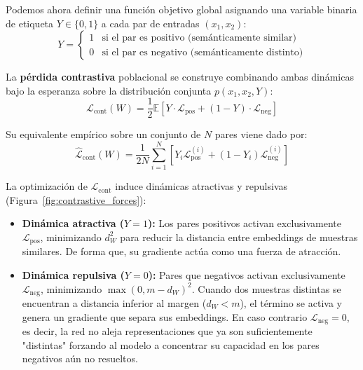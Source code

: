 Podemos ahora definir una función objetivo global asignando una variable binaria de etiqueta $Y \in \{0, 1\}$ a cada par de entradas $(x_1, x_2)$:
\begin{equation}
Y = \begin{cases}
1 & \text{si el par es positivo (semánticamente similar)} \\
0 & \text{si el par es negativo (semánticamente distinto)}
\end{cases}
\end{equation}
\vspace{2pt}

\begin{definition}
    
La \textbf{pérdida contrastiva} poblacional se construye combinando ambas dinámicas bajo la esperanza sobre la distribución conjunta $p(x_1, x_2, Y)$:
\begin{equation}
\mathcal{L}_{\text{cont}}(W) = \frac{1}{2} \mathbb{E} \left[ Y \cdot \mathcal{L}_{\text{pos}} + (1 - Y) \cdot \mathcal{L}_{\text{neg}} \right]
\label{eq:L_cont}
\end{equation}

Su equivalente empírico sobre un conjunto de $N$ pares viene dado por:
\begin{equation}
\hat{\mathcal{L}}_{\text{cont}}(W) = \frac{1}{2N} \sum_{i=1}^{N} \left[ Y_i \mathcal{L}_{\text{pos}}^{(i)} + (1 - Y_i) \mathcal{L}_{\text{neg}}^{(i)} \right]
\label{eq:L_cont_empirica}
\end{equation}
\end{definition}

La optimización de ${\mathcal{L}}_{\text{cont}}$ induce dinámicas atractivas y repulsivas (Figura~\ref{fig:contrastive_forces}):

\begin{itemize}
    \item \textbf{Dinámica atractiva ($Y=1$): } Los pares positivos activan exclusivamente $\mathcal{L}_{\text{pos}}$, minimizando $d_W^2$ para reducir la distancia entre embeddings de muestras similares. De forma que, su gradiente actúa como una fuerza de atracción.
    
    \item \textbf{Dinámica repulsiva ($Y=0$): } Pares que negativos activan exclusivamente $\mathcal{L}_{\text{neg}}$, minimizando $\max(0, m - d_W)^2$. Cuando dos muestras distintas se encuentran a distancia inferior al margen ($d_W < m$), el término se activa y genera un gradiente que separa sus embeddings. En caso contrario $\mathcal{L}_{\text{neg}}= 0$, es decir, la red no aleja representaciones que ya son suficientemente "distintas" forzando al modelo a concentrar su capacidad en los pares negativos aún no resueltos.
\end{itemize}



